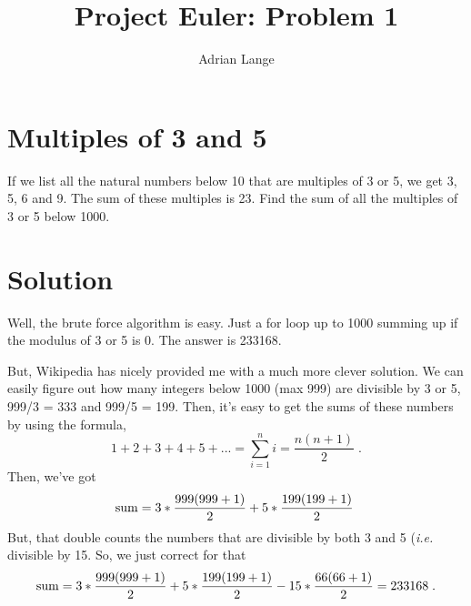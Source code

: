 \documentclass[11pt, oneside]{article}   	%
\title{Project Euler: Problem 1}
\author{Adrian Lange}
\begin{document}
\maketitle

\section{Multiples of 3 and 5}
If we list all the natural numbers below 10 that are multiples of 3 or 5, we get 3, 5, 6 and 9. The sum of these multiples is 23. 
Find the sum of all the multiples of 3 or 5 below 1000.

\section{Solution}
Well, the brute force algorithm is easy. Just a for loop up to 1000 summing up if the modulus of 3 or 5 is 0. The answer is 233168.

But, Wikipedia has nicely provided me with a much more clever solution. We can easily figure out how many integers below 1000 (max 999) are divisible by 3 or 5, 999/3 = 333 and 999/5 = 199. Then, it's easy to get the sums of these numbers by using the formula,
\begin{equation}
	1 + 2 + 3 + 4 + 5 + ... = \sum_{i=1}^{n} i = \frac{n(n+1)}{2} \;.
\end{equation}
Then, we've got
\begin{equation}
	{\rm sum} = 3 * \frac{999(999+1)}{2} + 5 * \frac{199(199+1)}{2} \;
\end{equation}
But, that double counts the numbers that are divisible by both 3 and 5 ({\em i.e.} divisible by 15. So, we just correct for that
\begin{equation}
	{\rm sum} = 3 * \frac{999(999+1)}{2} + 5 * \frac{199(199+1)}{2} - 15 * \frac{66(66+1)}{2} = 233168 \;.
\end{equation}
\end{document}
